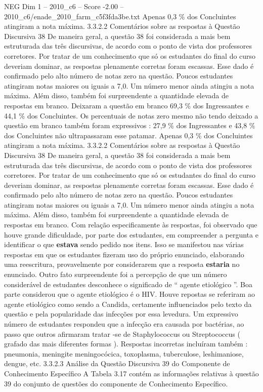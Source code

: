 \begin{textsample}{NEG Dim 1 – 2010\_c6 – Score -2.00 – 2010\_c6/enade\_2010\_farm\_c5f3fda3be.txt}
Apenas 0,3 \% dos Concluintes atingiram a nota máxima. 3.3.2.2 Comentários sobre as respostas à Questão Discursiva 38 De maneira geral, a questão 38 foi considerada a mais bem estruturada das três discursivas, de acordo com o ponto de vista dos professores corretores.
Por tratar de um conhecimento que só os estudantes do final do curso deveriam dominar, as respostas plenamente corretas foram escassas.
Esse dado é confirmado pelo alto número de notas zero na questão.
Poucos estudantes atingiram notas maiores ou iguais a 7,0.
Um número menor ainda atingiu a nota máxima.
Além disso, também foi surpreendente a quantidade elevada de respostas em branco.
Deixaram a questão em branco 69,3 \% dos Ingressantes e 44,1 \% dos Concluintes.
Os percentuais de notas zero mesmo não tendo deixado a questão em branco também foram expressivos : 27,9 \% dos Ingressantes e 43,8 \% dos Concluintes não ultrapassaram esse patamar.
Apenas 0,3 \% dos Concluintes atingiram a nota máxima. 3.3.2.2 Comentários sobre as respostas à Questão Discursiva 38 De maneira geral, a questão 38 foi considerada a mais bem estruturada das três discursivas, de acordo com o ponto de vista dos professores corretores.
Por tratar de um conhecimento que só os estudantes do final do curso deveriam dominar, as respostas plenamente corretas foram escassas.
Esse dado é confirmado pelo alto número de notas zero na questão.
Poucos estudantes atingiram notas maiores ou iguais a 7,0.
Um número menor ainda atingiu a nota máxima.
Além disso, também foi surpreendente a quantidade elevada de respostas em branco.
Com relação especificamente às respostas, foi observado que houve grande dificuldade, por parte dos estudantes, em compreender a pergunta e identificar o que \textbf{estava} sendo pedido nos itens.
Isso se manifestou nas várias respostas em que os estudantes fizeram uso do próprio enunciado, elaborando uma reescritura, provavelmente por considerarem que a resposta \textbf{estaria} no enunciado.
Outro fato surpreendente foi a percepção de que um número considerável de estudantes desconhece o significado de “ agente etiológico ”.
Boa parte considerou que o agente etiológico é o HIV.
Houve repostas se referiram ao agente etiológico como sendo a Candida, certamente influenciados pelo texto da questão e pela popularidade das infecções por essa levedura.
Um expressivo número de estudantes respondeu que a infecção era causada por bactérias, ao passo que outros afirmaram tratar -se de Staphylococcus ou Streptococcus ( grafado das mais diferentes formas ).
Respostas incorretas incluíram também : pneumonia, meningite meningocócica, toxoplasma, tuberculose, leshimaniose, dengue, etc. 3.3.2.3 Análise da Questão Discursiva 39 do Componente de Conhecimento Específico A Tabela 3.17 contém as informações relativas à questão 39 do conjunto de questões do componente de Conhecimento Específico.

\end{textsample}

